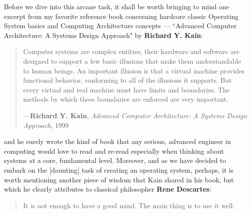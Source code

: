 \documentclass[a4paper, 18pt]{book} %
\begin{document}
{{{Before we dive into this arcane task, it shall be worth bringing to mind one excerpt from my favorite reference book concerning hardcore classic Operating System basics and Computing Architecture concepts --- ``Advanced Computer Architecture: A Systems Design Approach" by \textbf{Richard Y. Kain}:


\noindent
\begin{minipage}{1\textwidth}
\vspace{2em}
\begin{quotation}
{\ttfamily

Computer systems are complex entities; their hardware and software are designed to support a few basic illusions that make them understandable to human beings. An important illusion is that a virtual machine provides functional behavior, conforming to all of the illusions it supports. But every virtual and real machine must have limits and boundaries. The methods by which these boundaries are enforced are very important.

}
\hspace*{\fill} ---\textbf{Richard Y. Kain}, \textit{Advanced Computer Architecture: A Systems Design Approach}, 1999\cite{kain1999advanced}
\end{quotation}
\vspace{2em}
\end{minipage}


and he surely wrote the kind of book that any serious, advanced engineer in computing would love to read and re-read especially when thinking about systems at a core, fundamental level. Moreover, and as we have decided to embark on the [daunting] task of creating an operating system, perhaps, it is worth mentioning another piece of wisdom that Kain shared in his book, but which he clearly attributes to classical philosopher \textbf{Rene Descartes}:


\noindent
\begin{minipage}{1\textwidth}
\vspace{2em}
\begin{quotation}
{\ttfamily

It is not enough to have a good mind. The main thing is to use it well.

}
\end{quotation}
\vspace{2em}
\end{minipage}


\fbox{\begin{minipage}{\textwidth}
\LARGE


\end{minipage}}}}}
\end{document}
